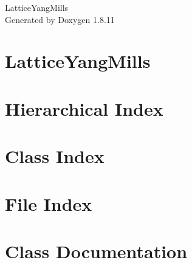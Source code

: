\documentclass[twoside]{book}
\newcommand{\+}{\discretionary{\mbox{\scriptsize$\hookleftarrow$}}{}{}}
\newcommand{\clearemptydoublepage}{%
  \newpage{\pagestyle{empty}\cleardoublepage}%
}
\begin{document}
\hypersetup{pageanchor=false,
             bookmarksnumbered=true,
             pdfencoding=unicode
            }
\begin{titlepage}
\vspace*{7cm}
\begin{center}%
{\Large Lattice\+Yang\+Mills }\\
\vspace*{1cm}
{\large Generated by Doxygen 1.8.11}\\
\end{center}
\end{titlepage}
\clearemptydoublepage
\tableofcontents
\clearemptydoublepage
{}
\hypersetup{pageanchor=true}

\chapter{Lattice\+Yang\+Mills}
\label{index}\hypertarget{index}{}
\chapter{Hierarchical Index}

\chapter{Class Index}

\chapter{File Index}

\chapter{Class Documentation}




















\end{document}
